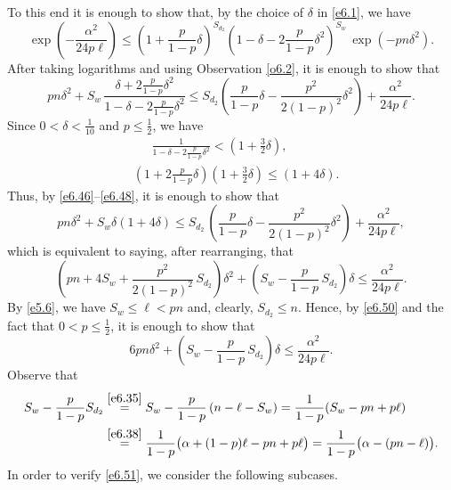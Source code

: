 \documentclass[10pt,a4paper]{amsart}
\theoremstyle{remark}
\newcommand{\mik}{\leqslant}
\begin{document}
To this end it is enough to show that, by the choice of $\delta$ in \eqref{e6.1}, we have
\begin{equation} \label{e6.45}
\exp\left(-\frac{\alpha^2}{24p\ell}\right) \mik \left(1+\frac{p}{1-p}\delta\right)^{S_{d_2}}
\left(1-\delta-2\frac{p}{1-p}\delta^2\right)^{S_w}\, \exp(-pn\delta^2).
\end{equation}
After taking logarithms and using Observation \ref{o6.2}, it is enough to show that
\begin{equation} \label{e6.46}
pn\delta^2+S_w\, \frac{\delta+2\frac{p}{1-p}\delta^2}{1-\delta-2\frac{p}{1-p}\delta^2} \mik S_{d_2}\left(\frac{p}{1-p}\delta-\frac{p^2}{2(1-p)^2}\delta^2\right)+\frac{\alpha^2}{24p\ell}.
\end{equation}
Since $0<\delta<\frac{1}{10}$ and $p\mik \frac12$, we have
\begin{align}
\label{e6.47} & \ \ \ \ \ \ \, \frac{1}{1-\delta-2\frac{p}{1-p}\delta^2} < \left(1+\frac32\delta\right), \\
\label{e6.48} & \left(1+2\frac{p}{1-p}\delta\right) \left(1+\frac32\delta\right)\mik (1+4\delta).
\end{align}
Thus, by \eqref{e6.46}--\eqref{e6.48}, it is enough to show that
\begin{equation} \label{e6.49}
pn\delta^2+S_w\delta(1+4\delta)\mik S_{d_2}\, \left(\frac{p}{1-p}\delta-\frac{p^2}{2(1-p)^2}\delta^2\right)
+\frac{\alpha^2}{24p\ell},
\end{equation}
which is equivalent to saying, after rearranging, that
\begin{equation} \label{e6.50}
\left(pn+4S_w+\frac{p^2}{2(1-p)^2}\, S_{d_2}\right)\delta^2+\left(S_w-\frac{p}{1-p}\,S_{d_2}\right)\delta
\mik \frac{\alpha^2}{24p\ell}.
\end{equation}
By \eqref{e5.6}, we have $S_w\mik\ell< pn$ and, clearly, $S_{d_2}\mik n$.
Hence, by \eqref{e6.50} and the fact that $0<p\mik \frac12$, it is enough to show that
\begin{equation} \label{e6.51}
6pn\delta^2 +\left(S_w-\frac{p}{1-p}\,S_{d_2}\right)\delta \mik \frac{\alpha^2}{24p\ell}.
\end{equation}
Observe that
\begin{align}
\label{e6.52} S_w-\frac{p}{1-p}S_{d_2} & \stackrel{\eqref{e6.35}}{=}
S_w-\frac{p}{1-p}\left(n-\ell-S_w\right) =\frac{1}{1-p}(S_w-pn+p\ell) \\
& \stackrel{\eqref{e6.38}}{=} \frac{1}{1-p}\big(\alpha+(1-p)\ell-pn+p\ell\big) =
\frac{1}{1-p}\big(\alpha-(pn-\ell)\big). \nonumber
\end{align}
In order to verify \eqref{e6.51}, we consider the following subcases.
\end{document}
